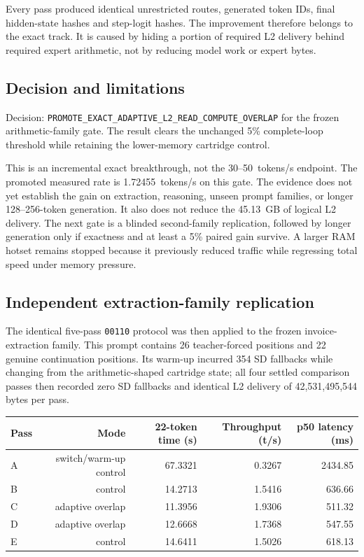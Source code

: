 Every pass produced identical unrestricted routes, generated token IDs, final
hidden-state hashes and step-logit hashes.  The improvement therefore belongs
to the exact track.  It is caused by hiding a portion of required L2 delivery
behind required expert arithmetic, not by reducing model work or expert bytes.

\subsection{Decision and limitations}

Decision: \texttt{PROMOTE\_EXACT\_ADAPTIVE\_L2\_READ\_COMPUTE\_OVERLAP} for
the frozen arithmetic-family gate.  The result clears the unchanged 5\%
complete-loop threshold while retaining the lower-memory cartridge control.

This is an incremental exact breakthrough, not the 30--50~tokens/s endpoint.
The promoted measured rate is 1.72455~tokens/s on this gate.  The evidence does
not yet establish the gain on extraction, reasoning, unseen prompt families,
or longer 128--256-token generation.  It also does not reduce the 45.13~GB of
logical L2 delivery.  The next gate is a blinded second-family replication,
followed by longer generation only if exactness and at least a 5\% paired gain
survive.  A larger RAM hotset remains stopped because it previously reduced
traffic while regressing total speed under memory pressure.

\subsection{Independent extraction-family replication}

The identical five-pass \texttt{00110} protocol was then applied to the frozen
invoice-extraction family.  This prompt contains 26 teacher-forced positions
and 22 genuine continuation positions.  Its warm-up incurred 354 SD fallbacks
while changing from the arithmetic-shaped cartridge state; all four settled
comparison passes then recorded zero SD fallbacks and identical L2 delivery of
42,531,495,544 bytes per pass.

\begin{center}
\begin{tabular}{lrrrr}
\toprule
Pass & Mode & 22-token time (s) & Throughput (t/s) & p50 latency (ms) \\
\midrule
A & switch/warm-up control & 67.3321 & 0.3267 & 2434.85 \\
B & control & 14.2713 & 1.5416 & 636.66 \\
C & adaptive overlap & 11.3956 & 1.9306 & 511.32 \\
D & adaptive overlap & 12.6668 & 1.7368 & 547.55 \\
E & control & 14.6411 & 1.5026 & 618.13 \\
\bottomrule
\end{tabular}
\end{center}

